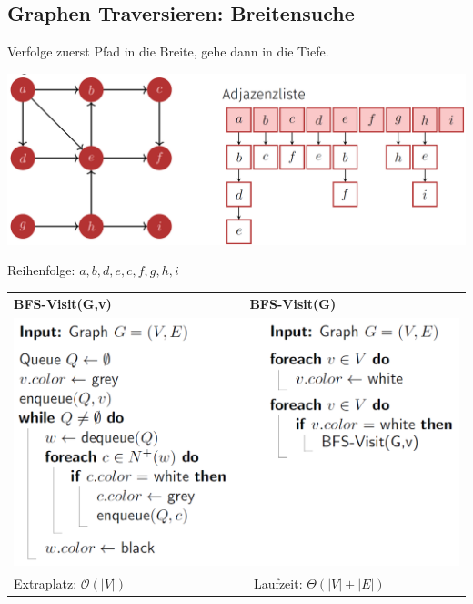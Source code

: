 \vspace{-4pt}
\begin{sectionbox}
\subsection{Graphen Traversieren: Breitensuche}\smallskip
Verfolge zuerst Pfad in die Breite, gehe dann in die Tiefe.\par
\begin{center}
    \includegraphics[width = 0.9\columnwidth]{../img/DFS_sym.png}
\end{center}\par
Reihenfolge: $a, b, d, e, c, f, g, h, i$\medskip

\begin{tabular*}{\columnwidth}{@{\extracolsep\fill}ll@{}}
\textbf{BFS-Visit(G,v)} & $\quad \quad \quad \quad$\textbf{BFS-Visit(G)} \\
\multicolumn{2}{l}{\includegraphics[width = 0.9\columnwidth]{../img/BFS.png}} \\
Extraplatz: $\mathcal{O}(|V|)$&  $\quad \quad \quad \quad$ Laufzeit: $\Theta(|V|+|E|)$ \\
\end{tabular*}

\end{sectionbox}
\vspace{-4pt}
